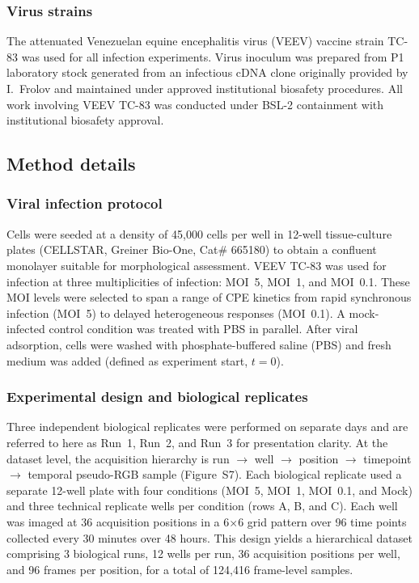 \documentclass[12pt,letterpaper]{article}
\begin{document}
\subsubsection*{Virus strains}

The attenuated Venezuelan equine encephalitis virus (VEEV) vaccine strain TC-83 was used for all infection experiments.
Virus inoculum was prepared from P1 laboratory stock generated from an infectious cDNA clone originally provided by I.~Frolov\cite{ref-kinney1993tc83} and maintained under approved institutional biosafety procedures.
All work involving VEEV TC-83 was conducted under BSL-2 containment with institutional biosafety approval.

\subsection*{Method details}

\subsubsection*{Viral infection protocol}

Cells were seeded at a density of 45,000 cells per well in 12-well tissue-culture plates (CELLSTAR, Greiner Bio-One, Cat\# 665180) to obtain a confluent monolayer suitable for morphological assessment.
VEEV TC-83 was used for infection at three multiplicities of infection: MOI~5, MOI~1, and MOI~0.1. These MOI levels were selected to span a range of CPE kinetics from rapid synchronous infection (MOI~5) to delayed heterogeneous responses (MOI~0.1).
A mock-infected control condition was treated with PBS in parallel.
After viral adsorption, cells were washed with phosphate-buffered saline (PBS) and fresh medium was added (defined as experiment start, $t=0$).

\subsubsection*{Experimental design and biological replicates}

Three independent biological replicates were performed on separate days and are referred to here as Run~1, Run~2, and Run~3 for presentation clarity.
At the dataset level, the acquisition hierarchy is run $\rightarrow$ well $\rightarrow$ position $\rightarrow$ timepoint $\rightarrow$ temporal pseudo-RGB sample (Figure~S7).
Each biological replicate used a separate 12-well plate with four conditions (MOI~5, MOI~1, MOI~0.1, and Mock) and three technical replicate wells per condition (rows A, B, and C).
Each well was imaged at 36 acquisition positions in a 6$\times$6 grid pattern over 96 time points collected every 30 minutes over 48 hours.
This design yields a hierarchical dataset comprising 3 biological runs, 12 wells per run, 36 acquisition positions per well, and 96 frames per position, for a total of 124,416 frame-level samples.
\end{document}
